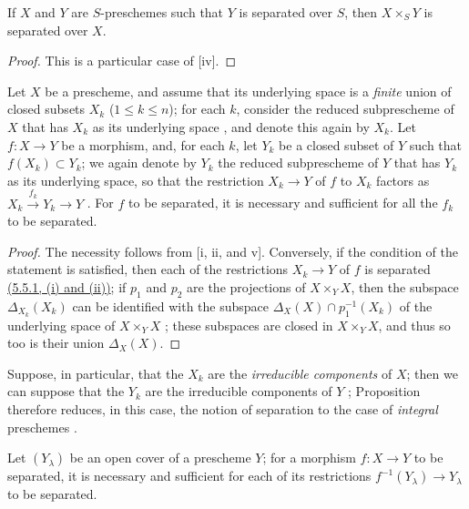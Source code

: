 \begin{corollary}[5.5.3]
\label{I.5.5.3}
If $X$ and $Y$ are $S$-preschemes such that $Y$ is separated over $S$, then $X\times_S Y$ is separated over $X$.
\end{corollary}

\begin{proof}
This is a particular case of [iv].
\end{proof}

\begin{proposition}[5.5.4]
\label{I.5.5.4}
Let $X$ be a prescheme, and assume that its underlying space is a \emph{finite} union of closed subsets $X_k$ ($1\leq k\leq n$);
for each $k$, consider the reduced subprescheme of $X$ that has $X_k$ as its underlying space , and denote this again by $X_k$.
Let $f:X\to Y$ be a morphism, and, for each $k$, let $Y_k$ be a closed subset of $Y$ such that $f(X_k)\subset Y_k$;
we again denote by $Y_k$ the reduced subprescheme of $Y$ that has $Y_k$ as its underlying space, so that the restriction $X_k\to Y$ of $f$ to $X_k$ factors as $X_k\xrightarrow{f_k}Y_k\to Y$ .
For $f$ to be separated, it is necessary and sufficient for all the $f_k$ to be separated.
\end{proposition}

\begin{proof}
The necessity follows from [i, ii, and v].
Conversely, if the condition of the statement is satisfied, then each of the restrictions $X_k\to Y$ of $f$ is separated \hyperref[I.5.5.1]{(5.5.1, (i) and (ii))};
if $p_1$ and $p_2$ are the projections of $X\times_Y X$, then the subspace $\Delta_{X_k}(X_k)$ can be identified with the subspace $\Delta_X(X)\cap p_1^{-1}(X_k)$ of the underlying space of $X\times_Y X$ ;
these subspaces are closed in $X\times_Y X$, and thus so too is their union $\Delta_X(X)$.
\end{proof}

Suppose, in particular, that the $X_k$ are the \emph{irreducible components} of $X$;
then we can suppose that the $Y_k$ are the irreducible components of $Y$ ;
Proposition~ therefore reduces, in this case, the notion of separation to the case of \emph{integral} preschemes .

\begin{proposition}[5.5.5]
\label{I.5.5.5}
Let $(Y_\lambda)$ be an open cover of a prescheme $Y$;
for a morphism $f:X\to Y$ to be separated, it is necessary and sufficient for each of its restrictions $f^{-1}(Y_\lambda)\to Y_\lambda$ to be separated.
\end{proposition}

